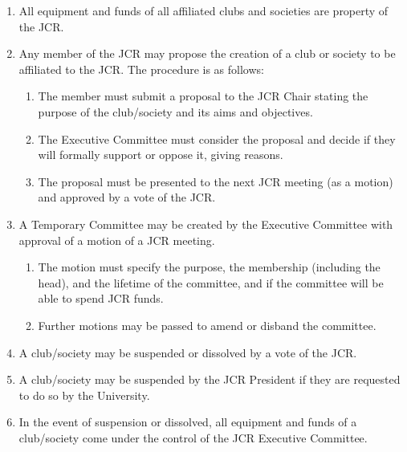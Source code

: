 \documentclass[12pt]{article}  %
\begin{document}
\begin{enumerate}
    \item All equipment and funds of all affiliated clubs and societies are property of the JCR.
    \item Any member of the JCR may propose the creation of a club or society to be affiliated to the JCR. The procedure is as follows:
    \begin{enumerate}
        \item The member must submit a proposal to the JCR Chair stating the purpose of the club/society and its aims and objectives.
        \item The Executive Committee must consider the proposal and decide if they will formally support or oppose it, giving reasons.
        \item The proposal must be presented to the next JCR meeting (as a motion) and approved by a vote of the JCR.
    \end{enumerate}
    \item A Temporary Committee may be created by the Executive Committee with approval of a motion of a JCR meeting.
    \begin{enumerate}
        \item The motion must specify the purpose, the membership (including the head), and the lifetime of the committee, and if the committee will be able to spend JCR funds.
        \item Further motions may be passed to amend or disband the committee.
    \end{enumerate}
    \item A club/society may be suspended or dissolved by a vote of the JCR.
    \item A club/society may be suspended by the JCR President if they are requested to do so by the University.
    \item In the event of suspension or dissolved, all equipment and funds of a club/society come under the control of the JCR Executive Committee.
\end{enumerate}
\newpage
\end{document}
